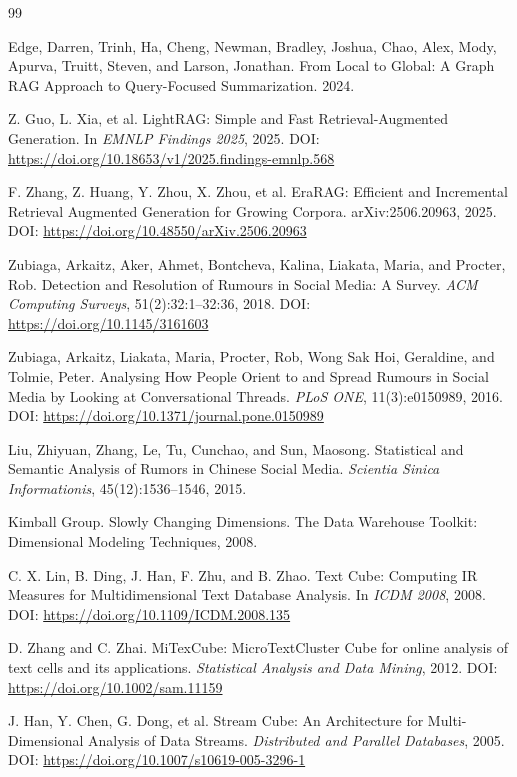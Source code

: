 \begin{thebibliography}{99}

 Edge, Darren, Trinh, Ha, Cheng, Newman, Bradley, Joshua, Chao, Alex, Mody, Apurva, Truitt, Steven, and Larson, Jonathan. From Local to Global: A Graph RAG Approach to Query-Focused Summarization. 2024.

 Z. Guo, L. Xia, et al. LightRAG: Simple and Fast Retrieval-Augmented Generation. In \emph{EMNLP Findings 2025}, 2025. DOI: \url{https://doi.org/10.18653/v1/2025.findings-emnlp.568}

 F. Zhang, Z. Huang, Y. Zhou, X. Zhou, et al. EraRAG: Efficient and Incremental Retrieval Augmented Generation for Growing Corpora. arXiv:2506.20963, 2025. DOI: \url{https://doi.org/10.48550/arXiv.2506.20963}

 Zubiaga, Arkaitz, Aker, Ahmet, Bontcheva, Kalina, Liakata, Maria, and Procter, Rob. Detection and Resolution of Rumours in Social Media: A Survey. \emph{ACM Computing Surveys}, 51(2):32:1–32:36, 2018. DOI: \url{https://doi.org/10.1145/3161603}

 Zubiaga, Arkaitz, Liakata, Maria, Procter, Rob, Wong Sak Hoi, Geraldine, and Tolmie, Peter. Analysing How People Orient to and Spread Rumours in Social Media by Looking at Conversational Threads. \emph{PLoS ONE}, 11(3):e0150989, 2016. DOI: \url{https://doi.org/10.1371/journal.pone.0150989}

 Liu, Zhiyuan, Zhang, Le, Tu, Cunchao, and Sun, Maosong. Statistical and Semantic Analysis of Rumors in Chinese Social Media. \emph{Scientia Sinica Informationis}, 45(12):1536–1546, 2015.

 Kimball Group. Slowly Changing Dimensions. The Data Warehouse Toolkit: Dimensional Modeling Techniques, 2008.

 C. X. Lin, B. Ding, J. Han, F. Zhu, and B. Zhao. Text Cube: Computing IR Measures for Multidimensional Text Database Analysis. In \emph{ICDM 2008}, 2008. DOI: \url{https://doi.org/10.1109/ICDM.2008.135}

 D. Zhang and C. Zhai. MiTexCube: MicroTextCluster Cube for online analysis of text cells and its applications. \emph{Statistical Analysis and Data Mining}, 2012. DOI: \url{https://doi.org/10.1002/sam.11159}

 J. Han, Y. Chen, G. Dong, et al. Stream Cube: An Architecture for Multi-Dimensional Analysis of Data Streams. \emph{Distributed and Parallel Databases}, 2005. DOI: \url{https://doi.org/10.1007/s10619-005-3296-1}


\end{thebibliography}
